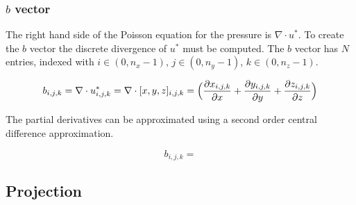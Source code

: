 \subsubsection{$b$ vector}

The right hand side of the Poisson equation for the pressure is $\nabla \cdot u^*$.
To create the $b$ vector the discrete divergence of $u^*$ must be computed. The 
$b$ vector has $N$ entries, indexed with $i \in (0, n_x-1)$, $j \in (0, n_y-1)$,
$k \in (0, n_z-1)$.

$$ b_{i,j,k} = \nabla \cdot u^*_{i,j,k} = \nabla \cdot [x, y, z]_{i,j,k} = 
\Big( \frac{\partial x_{i,j,k}}{\partial x} + \frac{\partial y_{i,j,k}}{\partial y} + \frac{\partial z_{i,j,k}}{\partial z} \Big) $$

The partial derivatives can be approximated using a second order 
central difference approximation.

$$ b_{i,j,k} =  $$

\subsection{Projection}

